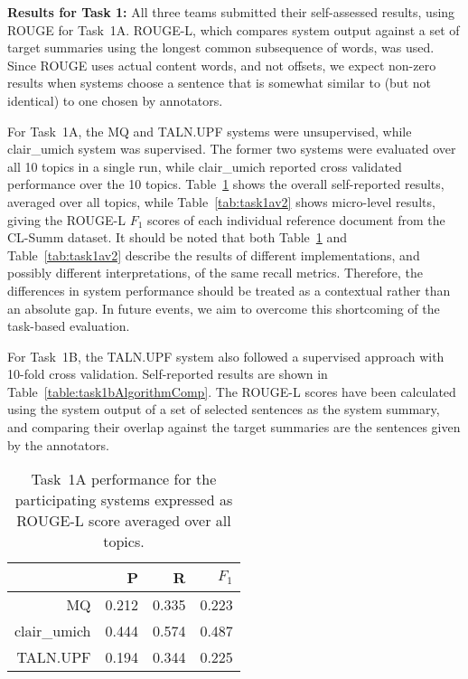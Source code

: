 \documentclass[11pt]{article}
\begin{document}
\textbf{Results for Task 1:} All three teams submitted their
self-assessed results, using ROUGE \cite{Lin:2004} for
Task~1A. ROUGE-L, which compares system output against a set of target
summaries using the longest common subsequence of words, was
used. Since ROUGE uses actual content words, and not offsets, we
expect non-zero results when systems choose a sentence that is
somewhat similar to (but not identical) to one chosen by annotators.

For Task~1A, the MQ and TALN.UPF systems were unsupervised, while
clair\_umich system was supervised. The former two systems were
evaluated over all 10 topics in a single run, while clair\_umich
reported cross validated performance over the 10 topics.
Table~\ref{tab:task1a} shows the overall self-reported results,
averaged over all topics, while Table~\ref{tab:task1av2} shows
micro-level results, giving the ROUGE-L $F_1$ scores of each
individual reference document from the CL-Summ dataset. It should be noted that
both Table~\ref{tab:task1a} and Table~\ref{tab:task1av2} describe
the results of different implementations, and possibly different interpretations,
of the same recall metrics. Therefore, the differences in system performance should be treated
as a contextual rather than an absolute gap. In future events, we aim to overcome this
shortcoming of the task-based evaluation.

For Task~1B, the TALN.UPF system also followed a supervised approach
with 10-fold cross validation.  Self-reported results are shown in
Table~\ref{table:task1bAlgorithmComp}.  The ROUGE-L scores have been
calculated using the system output of a set of selected sentences as
the system summary, and comparing their overlap against the target
summaries are the sentences given by the annotators.

\begin{table}[t]
\centering
	\begin{tabular}{|r|r|r|r|}
	\hline
	& P & R & $F_1$ \\
	\hline
MQ & 	0.212& 0.335& 0.223 \\
clair\_umich & 0.444& 0.574& 0.487 \\
TALN.UPF & 0.194& 0.344& 0.225\\
\hline
\end{tabular}
\caption{Task~1A performance for the participating systems expressed as ROUGE-L score
 averaged over all topics.}
\label{tab:task1a}
\end{table}
\end{document}
